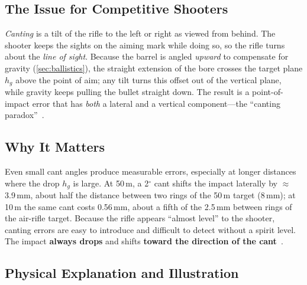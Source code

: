 \documentclass[11pt]{article}
\begin{document}
\subsection{The Issue for Competitive Shooters}
\emph{Canting} is a tilt of the rifle to the left or right as viewed
from behind.  The shooter keeps the sights on the aiming mark while
doing so, so the rifle turns about the \emph{line of sight}.  Because
the barrel is angled \emph{upward} to compensate for gravity
(\cref{sec:ballistics}), the straight extension of the bore crosses
the target plane $h_g$ above the point of aim; any tilt turns this
offset out of the vertical plane, while gravity keeps pulling the
bullet straight down.  The result is a point-of-impact error that has
\emph{both} a lateral and a vertical component---the ``canting
paradox''~\cite{rinker}.

\subsection{Why It Matters}
Even small cant angles produce measurable errors, especially at
longer distances where the drop $h_g$ is large.  At 50\,m, a
2$^\circ$ cant shifts the impact laterally by $\approx$\,3.9\,mm,
about half the distance between two rings of the 50\,m target
(8\,mm); at 10\,m the same cant costs 0.56\,mm, about a fifth of the
2.5\,mm between rings of the air-rifle target.  Because the rifle
appears ``almost level'' to the shooter, canting errors are easy to
introduce and difficult to detect without a spirit level.  The impact
\textbf{always drops} and shifts \textbf{toward the direction of
the cant}~\cite{nra,rinker}.

\subsection{Physical Explanation and Illustration}
\end{document}
